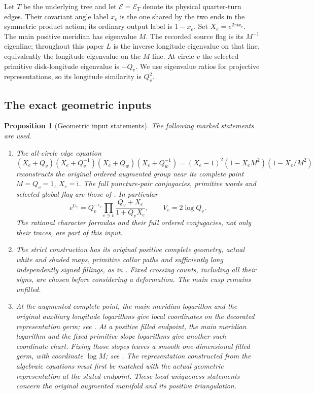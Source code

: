 \documentclass[11pt]{article}
\numberwithin{equation}{section}
\newtheorem{proposition}[theorem]{Proposition}
\theoremstyle{definition}\newtheorem{definition}[theorem]{Definition}
\theoremstyle{remark}\newtheorem{remark}[theorem]{Remark}
\newcommand{\ii}{\mathrm i}
\begin{document}
Let $T$ be the underlying tree and let $\mathcal E=\mathcal E_T$
denote its physical quarter-turn edges. Their covariant angle label $x_e$ is the one shared by the two ends in the symmetric product action; its ordinary output label is $1-x_e$. Set $X_e=e^{2\pi\ii x_e}$. The main positive meridian has eigenvalue $M$. The recorded source flag is its $M^{-1}$ eigenline; throughout this paper $L$ is the inverse longitude eigenvalue on that line, equivalently the longitude eigenvalue on the $M$ line. At circle $v$ the selected primitive disk-longitude eigenvalue is $-Q_v$. We use eigenvalue ratios for projective representations, so its longitude similarity is $Q_v^2$.

\subsection{The exact geometric inputs}
\begin{proposition}[Geometric input statements]\label{pl:imports}
The following marked statements are used.
\begin{enumerate}
\item The all-circle edge equation
\begin{equation}\label{pl:T1}
(X_e+Q_v)(X_e+Q_v^{-1})(X_e+Q_w)(X_e+Q_w^{-1})
 =(X_e-1)^2(1-X_eM^2)(1-X_e/M^2)
\end{equation}
reconstructs the original ordered augmented group near its complete point $M=Q_v=1$, $X_e=\ii$. The full puncture-pair conjugacies, primitive words and selected global flag are those of \cite[Theorems 1.1 and 3.1]{Nonparabolic}. In particular
\begin{equation}\label{pl:T3}
 e^{U_v}=Q_v^{-\epsilon_v}\prod_{e\ni v}\frac{Q_v+X_e}{1+Q_vX_e},\qquad V_v=2\log Q_v.
\end{equation}
The rational character formulas and their full ordered conjugacies, not only their traces, are part of this input.
\item The strict construction has its original positive complete geometry, actual white and shaded maps, primitive collar paths and sufficiently long independently signed fillings, as in \cite[Theorems 1.2--1.3 and Sections 6--8]{StrictGeometry}. Fixed crossing counts, including all their signs, are chosen before considering a deformation. The main cusp remains unfilled.
\item At the augmented complete point, the main meridian logarithm and
the original auxiliary longitude logarithms give local coordinates
on the decorated representation germ; see \cite[Theorem~1.1 and
Proposition~6.1]{Nonparabolic}. At a positive filled endpoint, the
main meridian logarithm and the fixed primitive slope logarithms
give another such coordinate chart. Fixing those slopes leaves a
smooth one-dimensional filled germ, with coordinate $\log M$;
see \cite[Theorem~1.2 and Proposition~6.1]{Nonparabolic}.
The representation constructed from the algebraic equations must
first be matched with the actual geometric representation at the
stated endpoint. These local uniqueness statements concern the
original augmented manifold and its positive triangulation.
\end{enumerate}
\end{proposition}
\end{document}
